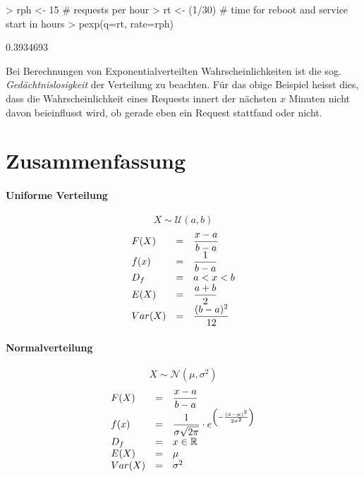 \begin{Schunk}
\begin{Sinput}
> rph <- 15 # requests per hour
> rt <- (1/30) # time for reboot and service start in hours
> pexp(q=rt, rate=rph)
\end{Sinput}
\begin{Soutput}
[1] 0.3934693
\end{Soutput}
\end{Schunk}

Bei Berechnungen von Exponentialverteilten Wahrscheinlichkeiten ist die 
sog. \emph{Gedächtnislosigkeit} der Verteilung zu beachten. Für das obige
Beispiel heisst dies, dass die Wahrscheinlichkeit eines Requests innert
der nächsten $x$ Minuten nicht davon beieinflusst wird, ob gerade eben
ein Request stattfand oder nicht.

\newpage
\section{Zusammenfassung}
\paragraph{Uniforme Verteilung}
\[ X \sim \mathcal{U}(a,b) \]
\[ \begin{array}{l c l}
	F(X) 
		& =
		& \displaystyle \frac{x-a}{b-a} \\
	f(x)	
		& =
		& \displaystyle \frac{1}{b-a}  \\
	D_f	
		& = 
		& a < x < b \\
	E(X)
		& = 
		& \displaystyle \frac{a+b}{2}\\
	Var(X)	
		& =
		& \displaystyle \frac{(b-a)^2}{12}\\
\end{array} \]

\paragraph{Normalverteilung}
\[ X \sim \mathcal{N}(\mu, \sigma^2) \]
\[ \begin{array}{l c l}
	F(X) 
		& =
		& \displaystyle \frac{x-a}{b-a} \\
	f(x)	
		& =
		& \displaystyle \frac{1}{\sigma\sqrt{2\pi}} \cdot
				e^{\left(
					-\frac{(x-\mu)^2}{2\sigma^2}
				\right)} \\
	D_f	
		& = 
		& x \in \mathbb{R} \\
	E(X)
		& = 
		& \mu\\
	Var(X)	
		& =
		& \sigma^2 \\
\end{array} \]

